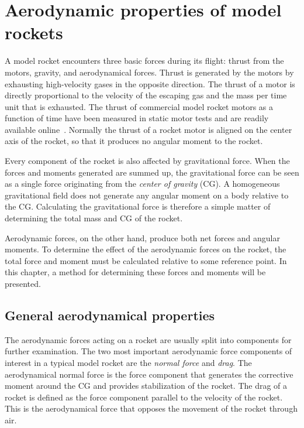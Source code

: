 

\chapter{Aerodynamic properties of model rockets~~}
\label{chap-aerodynamics}

A model rocket encounters three basic forces during its flight:
thrust from the motors, gravity, and aerodynamical forces.  Thrust is
generated by the motors by exhausting high-velocity gases in the
opposite direction.  The thrust of a motor is directly proportional to
the velocity of the escaping gas and the mass per time unit that is
exhausted.  The thrust of commercial model rocket motors as a function
of time have been measured in static motor tests and are readily
available online~\cite{thrust-curve-database}.  Normally the thrust of
a rocket motor is aligned on the center axis of the rocket, so that it
produces no angular moment to the rocket.

Every component of the rocket is also affected by gravitational
force.  When the forces and moments generated are summed up, the
gravitational force can be seen as a single force originating from the
{\it center of gravity} (CG).  A homogeneous gravitational field does
not generate any angular moment on a body relative to the CG.
Calculating the gravitational force is therefore a simple matter of
determining the total mass and CG of the rocket.

Aerodynamic forces, on the other hand, produce both net forces and
angular moments.  To determine the effect of the aerodynamic
forces on the rocket, the total force and moment must be calculated
relative to some reference point.  In this chapter, a method for
determining these forces and moments will be presented.



\section{General aerodynamical properties}
\label{sec-general-aerodynamics}

The aerodynamic forces acting on a rocket are usually split into
components for further examination.  The two most important
aerodynamic force components of interest in a typical model rocket are
the {\it normal force} and {\it drag}.  The aerodynamical normal
force is the force component that generates the corrective moment
around the CG and provides stabilization of the rocket.  The 
drag of a rocket is defined as the force component parallel to the
velocity of the rocket.  This is the aerodynamical force that opposes
the movement of the rocket through air.

